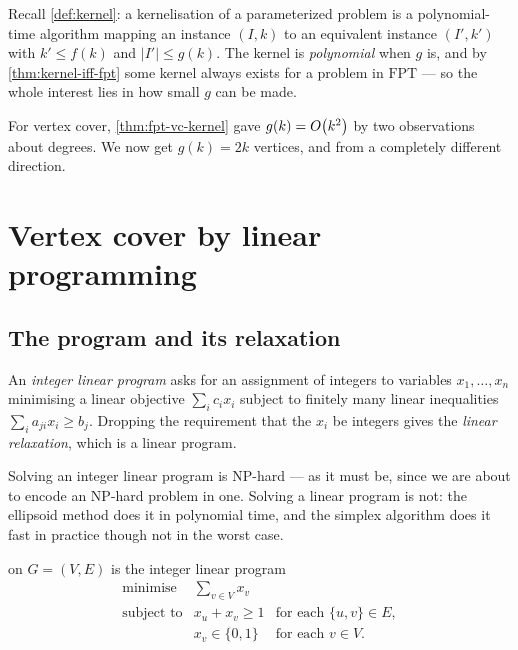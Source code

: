 Recall \cref{def:kernel}: a kernelisation of a parameterized problem is a
polynomial-time algorithm mapping an instance $(I,k)$ to an equivalent instance
$(I',k')$ with $k' \le f(k)$ and $|I'| \le g(k)$. The kernel is
\emph{polynomial} when $g$ is, and by \cref{thm:kernel-iff-fpt} some kernel
always exists for a problem in $\mathrm{FPT}$ --- so the whole interest lies in
how small $g$ can be made.

For vertex cover, \cref{thm:fpt-vc-kernel} gave $g(k) = O\!\left(k^2\right)$ by two
observations about degrees. We now get $g(k) = 2k$ vertices, and from a
completely different direction.

\section{Vertex cover by linear programming}
\label{sec:nemhauser-trotter}

\subsection{The program and its relaxation}

\begin{definition}\label{def:ilp}
An \emph{integer linear program} asks for an assignment of integers to
variables $x_1,\ldots,x_n$ minimising a linear objective
$\sum_i c_i x_i$ subject to finitely many linear inequalities
$\sum_i a_{ji} x_i \ge b_j$. Dropping the requirement that the $x_i$ be
integers gives the \emph{linear relaxation}, which is a linear program.
\end{definition}

Solving an integer linear program is \textrm{NP}-hard --- as it must be, since
we are about to encode an \textrm{NP}-hard problem in one. Solving a linear
program is not: the ellipsoid method does it in polynomial time, and the
simplex algorithm does it fast in practice though not in the worst case.

\begin{proposition}\label{prop:vc-ilp}
 on $G = (V,E)$ is the integer linear program
\[
\begin{array}{lll}
  \text{minimise}   & \displaystyle\sum_{v \in V} x_v & \\[2pt]
  \text{subject to} & x_u + x_v \ge 1 & \text{for each } \{u,v\} \in E, \\[2pt]
                    & x_v \in \{0,1\} & \text{for each } v \in V.
\end{array}
\]
\end{proposition}


